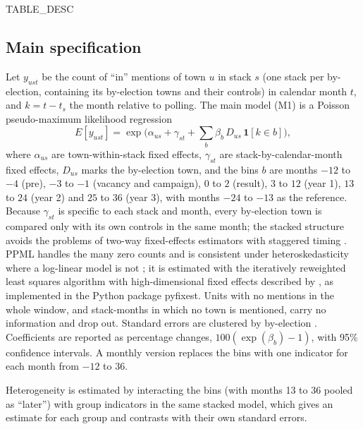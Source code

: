 \documentclass[11pt,a4paper]{article}
\begin{document}
{{TABLE_DESC}}

\subsection{Main specification}
Let $y_{ust}$ be the count of ``in'' mentions of town $u$ in stack $s$ (one stack per by-election, containing its by-election towns and their controls) in calendar month $t$, and $k = t - t_s$ the month relative to polling. The main model (M1) is a Poisson pseudo-maximum likelihood regression
\begin{equation}
E[y_{ust}] = \exp\Big(\alpha_{us} + \gamma_{st} + \sum_{b} \beta_b \, D_{us} \, \mathbf{1}[k \in b]\Big),
\end{equation}
where $\alpha_{us}$ are town-within-stack fixed effects, $\gamma_{st}$ are stack-by-calendar-month fixed effects, $D_{us}$ marks the by-election town, and the bins $b$ are months $-12$ to $-4$ (pre), $-3$ to $-1$ (vacancy and campaign), $0$ to $2$ (result), $3$ to $12$ (year 1), $13$ to $24$ (year 2) and $25$ to $36$ (year 3), with months $-24$ to $-13$ as the reference. Because $\gamma_{st}$ is specific to each stack and month, every by-election town is compared only with its own controls in the same month; the stacked structure avoids the problems of two-way fixed-effects estimators with staggered timing \citep{baker2022,sun2021,cengiz2019}. PPML handles the many zero counts and is consistent under heteroskedasticity where a log-linear model is not \citep{santos2006}; it is estimated with the iteratively reweighted least squares algorithm with high-dimensional fixed effects described by \citet{correia2020}, as implemented in the Python package pyfixest. Units with no mentions in the whole window, and stack-months in which no town is mentioned, carry no information and drop out. Standard errors are clustered by by-election \citep{cameron2015,abadie2023}. Coefficients are reported as percentage changes, $100(\exp(\beta_b)-1)$, with 95\% confidence intervals. A monthly version replaces the bins with one indicator for each month from $-12$ to $36$.

Heterogeneity is estimated by interacting the bins (with months 13 to 36 pooled as ``later'') with group indicators in the same stacked model, which gives an estimate for each group and contrasts with their own standard errors.
\end{document}
